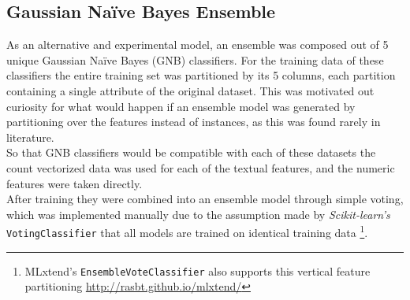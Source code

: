 \documentclass[twocolumn, 11pt]{article}
\begin{document}
\subsection{Gaussian Naïve Bayes Ensemble}
As an alternative and experimental model, an ensemble was composed out of 5 unique Gaussian Naïve Bayes (GNB) \cite{scikit-learn} classifiers. For the training data of these classifiers the entire training set was partitioned by its 5 columns, each partition containing a single attribute of the original dataset. This was motivated out curiosity for what would happen if an ensemble model was generated by partitioning over the features instead of instances, as this was found rarely in literature.\\[2mm]
So that GNB classifiers would be compatible with each of these datasets the count vectorized data was used for each of the textual features, and the numeric features were taken directly.\\[2mm]
After training they were combined into an ensemble model through simple voting, which was implemented manually due to the assumption made by \textit{Scikit-learn's} \verb|VotingClassifier| that all models are trained on identical training data \footnote{MLxtend's \verb|EnsembleVoteClassifier| also supports this vertical feature partitioning \url{http://rasbt.github.io/mlxtend/}}.
\end{document}
